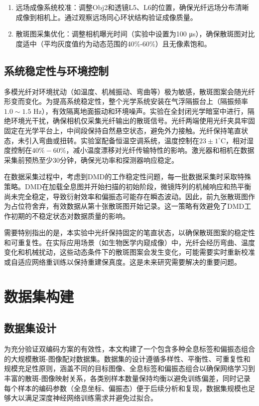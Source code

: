 {\begin{enumerate}
    \item 远场成像系统校准：调整Obj2和透镜L5、L6的位置，确保光纤远场分布清晰成像到相机上。通过观察远场同心环状结构验证成像质量。
    
    \item 散斑图采集优化：调整相机曝光时间（实验中设置为100 μs），确保散斑图对比度适中（平均灰度值约为动态范围的40\%-60\%）且无像素饱和。
\end{enumerate}

\subsection{系统稳定性与环境控制}\label{sec:stability}

多模光纤对环境扰动（如温度、机械振动、弯曲等）极为敏感，散斑图案会随光纤形变而变化。为提高系统稳定性，整个光学系统安装在气浮隔振台上（隔振频率$1.0\sim1.5$ Hz），有效隔离地面振动和环境噪声。实验在全封闭光学暗室中进行，隔绝环境光干扰，确保相机仅采集光纤输出的散斑信号。光纤两端使用光纤夹具牢固固定在光学平台上，中间段保持自然悬空状态，避免外力接触。光纤保持笔直状态，未引入弯曲或扭转。实验室配备恒温空调系统，温度控制在$23 \pm 1^\circ\mathrm{C}$，相对湿度控制在$40\%-60\%$，减小温度漂移对光纤传输特性的影响。激光器和相机在数据采集前预热至少30分钟，确保光功率和探测器响应稳定。

在数据采集过程中，考虑到DMD的工作稳定性问题，每一批数据采集时采取特殊策略。DMD在加载全息图并开始扫描的初始阶段，微镜阵列的机械响应和热平衡尚未完全稳定，导致衍射效率和偏振态可能存在瞬态波动。因此，前九张散斑图作为占位符舍弃，有效数据从第十张散斑图开始记录。这一策略有效避免了DMD工作初期的不稳定状态对数据质量的影响。

需要特别指出的是，本实验中光纤保持固定的笔直状态，以确保散斑图案的稳定性和可重复性。在实际应用场景（如生物医学内窥成像）中，光纤会经历弯曲、温度变化和机械扰动，这些动态条件下的散斑图案会发生变化，可能需要实时重新校准或自适应网络重训练以保持重建保真度。这是未来研究需要解决的重要问题。


\section{数据集构建}\label{sec:dataset_construction}

\subsection{数据集设计}\label{sec:dataset_design}

为充分验证双编码方案的有效性，本文构建了一个包含多种全息标签和偏振态组合的大规模散斑-图像配对数据集。数据集的设计遵循多样性、平衡性、可重复性和规模充足性原则，涵盖不同的目标图像、全息标签和偏振态组合以确保网络学习到丰富的散斑-图像映射关系，各类别样本数量保持均衡以避免训练偏差，同时记录每个样本的编码参数（全息坐标、偏振态）便于后续分析和复现，数据集规模也足够大以满足深度神经网络训练需求并避免过拟合。

}
